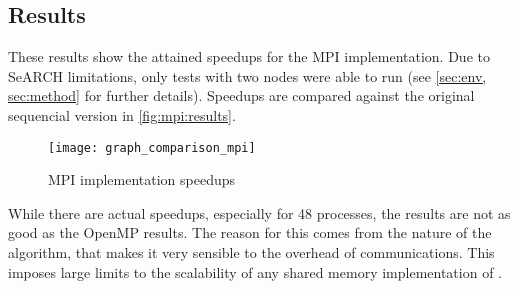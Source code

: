 \subsection{Results}
\label{sec:mpi:results}

These results show the attained speedups for the MPI implementation. Due to SeARCH limitations, only tests with two nodes were able to run (see \cref{sec:env, sec:method} for further details). Speedups are compared against the original sequencial version in \cref{fig:mpi:results}.

\begin{figure}[!htp]
	\centering
	\texttt{[image: graph\_comparison\_mpi]}
	\caption{MPI implementation speedups}
	\label{fig:cuda:results}
\end{figure}

While there are actual speedups, especially for 48 processes, the results are not as good as the OpenMP results. The reason for this comes from the nature of the algorithm, that makes it very sensible to the overhead of communications. This imposes large limits to the scalability of any shared memory implementation of \polu.
